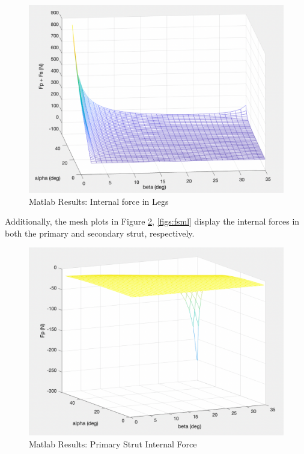 \begin{figure}[H]
\centering
\includegraphics[scale=0.6]{src/figs/ml2.png}
\caption{Matlab Results: Internal force in Legs}
\label{figs:ml2}
\end{figure}

Additionally, the mesh plots in Figure \ref{figs:fpml}, \ref{figs:fsml} display the internal forces in both the primary and secondary strut, respectively. 

\begin{figure}[H]
\centering
\includegraphics[scale=0.6]{src/figs/fpml.png}
\caption{Matlab Results: Primary Strut Internal Force}
\label{figs:fpml}
\end{figure}

